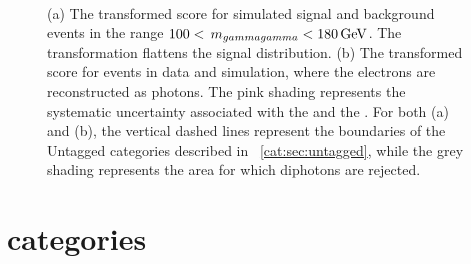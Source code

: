 \begin{figure}[h]
\centering
\\
\caption{ (a) The transformed \DiPhoBdt score for simulated signal and background events in the range $100 < \,m_{gammagamma} < 180\,\text{Ge\hspace{-.08em}V}$. The transformation flattens the signal distribution. (b) The transformed \DiPhoBdt score for \Zee events in data and simulation, where the electrons are reconstructed as photons. The pink shading represents the systematic uncertainty associated with the \PhoIdBdt and the \PhoEnergyBdt. For both (a) and (b), the vertical dashed lines represent the boundaries of the Untagged categories described in \Sec~\ref{cat:sec:untagged}, while the grey shading represents the area for which diphotons are rejected.}
\label{fig:cat:diphobdt}
\end{figure}

\section{\VBFTag categories }
\label{cat:sec:vbftag}

